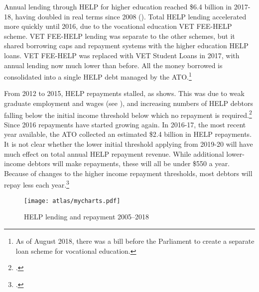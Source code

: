 \documentclass{grattan}
\begin{document}
Annual lending through HELP for higher education reached \$6.4 billion in 2017-18, having doubled in real terms since 2008 (). Total HELP lending accelerated more quickly until 2016, due to the vocational education VET FEE-HELP scheme. VET FEE-HELP lending was separate to the other schemes, but it shared borrowing caps and repayment systems with the higher education HELP loans. VET FEE-HELP was replaced with VET Student Loans in 2017, with annual lending now much lower than before. All the money borrowed is consolidated into a single HELP debt managed by the ATO.\footnote{As of August 2018, there was a bill before the Parliament to create a separate loan scheme for vocational education.}

From 2012 to 2015, HELP repayments stalled, as  shows. This was due to weak graduate employment and wages (see ), and increasing numbers of HELP debtors falling below the initial income threshold below which no repayment is required.\footcite[][chapter~3]{Norton2016helpforthefuture} Since 2016 repayments have started growing again. In 2016-17, the most recent year available, the ATO collected an estimated \$2.4 billion in HELP repayments. It is not clear whether the lower initial threshold applying from 2019-20 will have much effect on total annual HELP repayment revenue. While additional lower-income debtors will make repayments, these will all be under \$550 a year. Because of changes to the higher income repayment thresholds, most debtors will repay less each year.\footcite[][]{Norton2018submissiontothee}


    \begin{figure} %
    \caption{HELP lending and repayment 2005--2018}\label{fig:help-lending-and-repayment-20052018}
    \texttt{[image: atlas/mycharts.pdf]}
    \end{figure}
\end{document}
